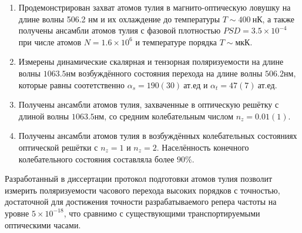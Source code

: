 {\novelty}
\begin{enumerate}
	\item Продемонстрирован захват атомов тулия в магнито-оптическую ловушку на длине волны 506.2 нм и их охлаждение до температуры $T\sim400~\text{нК}$, а также получены ансамбли атомов тулия с фазовой плотностью $PSD = 3.5\times10^{-4}$ при числе атомов $N = 1.6\times10^6$ и температуре порядка $T\sim\unit{мкК}$.
	\item Измерены динамические скалярная и тензорная поляризуемости  на длине волны $1063.5\unit{нм}$ возбуждённого состояния перехода на длине волны $506.2\unit{нм}$, которые равны соотетственно $\alpha_s = 190(30)~\text{ат.ед}$ и $\alpha_t = 47(7)~\text{ат.ед}$.
	\item Получены ансамбли атомов тулия, захваченные в оптическую решётку с длиной волны $1063.5\unit{нм}$, со средним колебательным числом $n_z = 0.01(1)$.
	\item Получены ансамбли атомов тулия в возбуждённых колебательных состояниях оптической решётки с $n_z = 1$ и $n_z = 2$. Населённость конечного колебательного состояния составляла более $90\%$.
\end{enumerate}

{\influence} 
Разработанный в диссертации протокол подготовки атомов тулия позволит измерить поляризуемости часового перехода высоких порядков с точностью, достаточной для достижения точности разрабатываемого репера частоты на уровне $5\times10^{-18}$, что сравнимо с существующими транспортируемыми оптическими часами. 



{}

